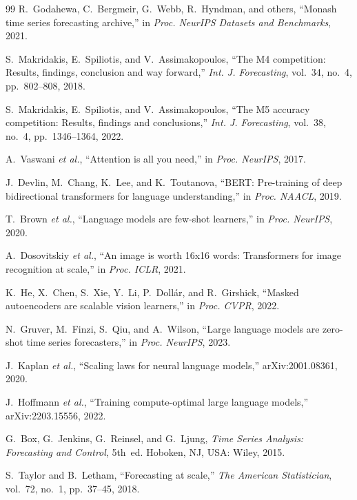 \documentclass[conference]{IEEEtran}
\begin{document}
\begin{thebibliography}{99}
R.~Godahewa, C.~Bergmeir, G.~Webb, R.~Hyndman, and others,
``Monash time series forecasting archive,''
in \emph{Proc. NeurIPS Datasets and Benchmarks}, 2021.

S.~Makridakis, E.~Spiliotis, and V.~Assimakopoulos,
``The M4 competition: Results, findings, conclusion and way forward,''
\emph{Int. J. Forecasting}, vol.~34, no.~4, pp.~802--808, 2018.

S.~Makridakis, E.~Spiliotis, and V.~Assimakopoulos,
``The M5 accuracy competition: Results, findings and conclusions,''
\emph{Int. J. Forecasting}, vol.~38, no.~4, pp.~1346--1364, 2022.

A.~Vaswani \emph{et al.},
``Attention is all you need,''
in \emph{Proc. NeurIPS}, 2017.

J.~Devlin, M.~Chang, K.~Lee, and K.~Toutanova,
``BERT: Pre-training of deep bidirectional transformers for language understanding,''
in \emph{Proc. NAACL}, 2019.

T.~Brown \emph{et al.},
``Language models are few-shot learners,''
in \emph{Proc. NeurIPS}, 2020.

A.~Dosovitskiy \emph{et al.},
``An image is worth 16x16 words: Transformers for image recognition at scale,''
in \emph{Proc. ICLR}, 2021.

K.~He, X.~Chen, S.~Xie, Y.~Li, P.~Doll\'ar, and R.~Girshick,
``Masked autoencoders are scalable vision learners,''
in \emph{Proc. CVPR}, 2022.

N.~Gruver, M.~Finzi, S.~Qiu, and A.~Wilson,
``Large language models are zero-shot time series forecasters,''
in \emph{Proc. NeurIPS}, 2023.

J.~Kaplan \emph{et al.},
``Scaling laws for neural language models,''
arXiv:2001.08361, 2020.

J.~Hoffmann \emph{et al.},
``Training compute-optimal large language models,''
arXiv:2203.15556, 2022.

G.~Box, G.~Jenkins, G.~Reinsel, and G.~Ljung,
\emph{Time Series Analysis: Forecasting and Control}, 5th~ed.
Hoboken, NJ, USA: Wiley, 2015.

S.~Taylor and B.~Letham,
``Forecasting at scale,''
\emph{The American Statistician}, vol.~72, no.~1, pp.~37--45, 2018.


\end{thebibliography}
\end{document}
